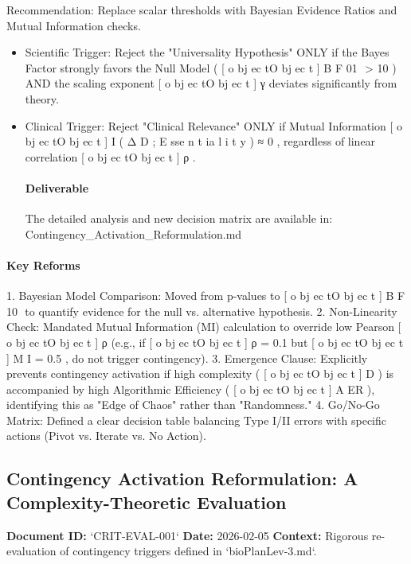 \documentclass{article}
\begin{document}
Recommendation: Replace scalar thresholds with Bayesian Evidence Ratios and Mutual Information checks.

\begin{itemize}
\item Scientific Trigger: Reject the "Universality Hypothesis" ONLY if the Bayes Factor strongly favors the Null Model ( [ o bj ec tO bj ec t ] B F 01 ​ > 10 ) AND the scaling exponent [ o bj ec tO bj ec t ] γ deviates significantly from theory.
\item Clinical Trigger: Reject "Clinical Relevance" ONLY if Mutual Information [ o bj ec tO bj ec t ] I ( Δ D ; E sse n t ia l i t y ) ≈ 0 , regardless of linear correlation [ o bj ec tO bj ec t ] ρ .
\paragraph{Deliverable}
The detailed analysis and new decision matrix are available in: Contingency\_Activation\_Reformulation.md
\end{itemize}

\paragraph{Key Reforms}
1. Bayesian Model Comparison: Moved from p-values to [ o bj ec tO bj ec t ] B F 10 ​ to quantify evidence for the null vs. alternative hypothesis.
2. Non-Linearity Check: Mandated Mutual Information (MI) calculation to override low Pearson [ o bj ec tO bj ec t ] ρ (e.g., if [ o bj ec tO bj ec t ] ρ = 0.1 but [ o bj ec tO bj ec t ] M I = 0.5 , do not trigger contingency).
3. Emergence Clause: Explicitly prevents contingency activation if high complexity ( [ o bj ec tO bj ec t ] D ) is accompanied by high Algorithmic Efficiency ( [ o bj ec tO bj ec t ] A ER ), identifying this as "Edge of Chaos" rather than "Randomness."
4. Go/No-Go Matrix: Defined a clear decision table balancing Type I/II errors with specific actions (Pivot vs. Iterate vs. No Action).



\subsection{Contingency Activation Reformulation: A Complexity-Theoretic Evaluation}

\textbf{Document ID:} `CRIT-EVAL-001`
\textbf{Date:} 2026-02-05
\textbf{Context:} Rigorous re-evaluation of contingency triggers defined in `bioPlanLev-3.md`.
\end{document}
